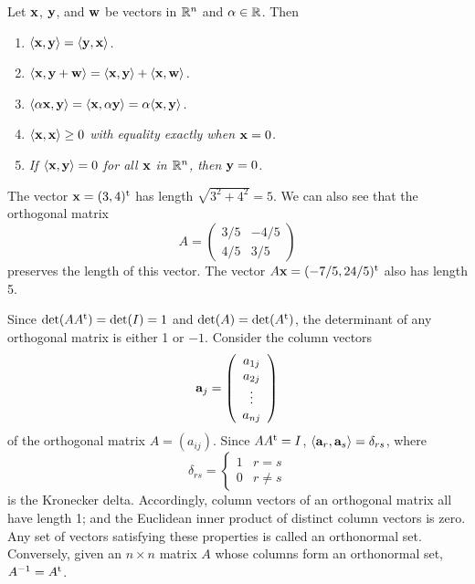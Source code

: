  
\begin{proposition}
Let ${\bold x}$, ${\bold y}$, and ${\bold w}$ be vectors in ${\Bbb
R}^n$ and $\alpha \in {\Bbb R}$. Then 
\begin{enumerate}
 
\rm \item \it
$\langle {\bold x}, {\bold y} \rangle = \langle {\bold y}, {\bold x}
\rangle$. 
 
\rm \item \it
$\langle {\bold x}, {\bold y} + {\bold w} \rangle = \langle {\bold x},
{\bold y} \rangle + \langle {\bold x}, {\bold w} \rangle$.
 
\rm \item \it
$\langle \alpha {\bold x}, {\bold y} \rangle = \langle {\bold x},
\alpha {\bold y} \rangle = \alpha \langle  {\bold x}, {\bold y}
\rangle$. 
 
\rm \item \it
$\langle {\bold x}, {\bold x} \rangle \geq 0$ with equality exactly
when ${\bold x} = 0$. 
 
\rm \item \it
If $\langle {\bold x}, {\bold y} \rangle = 0$  for all ${\bold x}$ in
${\Bbb R}^n$, then ${\bold y} = 0$. 
 
\end{enumerate}
\end{proposition}
 
 
\begin{example}{}
The vector ${\bold x} =(3,4)^{\rm t}$ has length $\sqrt{3^2 + 4^2} = 5$.  We
can also see that the orthogonal matrix 
\[
A=
\left(
\begin{array}{cc}
3/5 & -4/5 \\
4/5 & 3/5
\end{array}
\right)
\]
preserves the length of this vector. The vector $A{\bold x} =
(-7/5,24/5)^{\rm t}$ also has length 5. 
\end{example}
 
 
Since $\det(A A^{\rm t}) = \det(I) = 1$ and $\det(A) = \det( A^{\rm t}
)$, the determinant of any orthogonal matrix is either 1 or $-1$.
Consider the column vectors 
\[
{\bold a}_j
=
\left(
\begin{array}{c}
a_{1j} \\
a_{2j} \\
\vdots \\
a_{nj}
\end{array}
\right)
\]
of the orthogonal matrix
$A= (a_{ij})$. Since
$AA^{\rm t} = I$,
$\langle {\bold a}_r, {\bold a}_s \rangle = \delta_{rs}$,
where
\[
\delta_{rs}
=
\left\{
\begin{array}{cc}
1 & r = s \\
0 & r \neq s
\end{array}
\right.
\]
is the Kronecker delta. Accordingly, column
vectors of an orthogonal matrix all have length 1; and the Euclidean
inner product of distinct column vectors is zero. Any set of vectors
satisfying these properties is called an {\bfi orthonormal
set}. Conversely, given an $n \times n$ matrix
$A$ whose columns form an orthonormal set, $A^{-1} = A^{\rm t}$.
 
